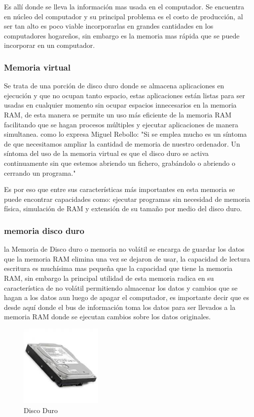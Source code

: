 \documentclass{article}
\begin{document}
        Es allí donde se lleva la información mas usada en el computador. Se encuentra en núcleo del computador y su principal problema es el costo de producción, al ser tan alto es poco viable incorporarlas en grandes cantidades en los computadores hogareños, sin embargo es la memoria mas rápida que se puede incorporar en un computador.   
        
        
        
        
        \subsubsection{Memoria virtual}
        Se trata de una porción de disco duro donde se almacena aplicaciones en ejecución y que no ocupan tanto espacio, estas aplicaciones están listas para ser usadas en cualquier momento sin ocupar espacios innecesarios en la memoria RAM, de esta manera se permite un uso más eficiente de la memoria RAM facilitando que se hagan procesos múltiples y ejecutar aplicaciones de manera simultanea. como lo expresa Miguel Rebollo: "Si se emplea mucho es un síntoma de que necesitamos ampliar la cantidad de memoria de nuestro ordenador. Un síntoma del uso de la memoria virtual es que el disco duro se activa continuamente sin que estemos abriendo un fichero, grabándolo o abriendo o cerrando un programa."\cite{rebollo} 
        
        Es por eso que entre sus características más importantes en esta memoria se puede encontrar capacidades como: ejecutar programas sin necesidad de memoria física, simulación de RAM y extensión de su tamaño por medio del disco duro.\cite{gestion}  
        
        \subsubsection{memoria disco duro}
        la Memoria de Disco duro o memoria no volátil se encarga de guardar los datos que la memoria RAM elimina una vez se dejaron de usar, la capacidad de lectura  escritura es muchísima mas pequeña que la capacidad que tiene la memoria RAM, sin embargo la principal utilidad de esta memoria radica en su característica de no volátil permitiendo almacenar los datos y cambios que se hagan a los datos aun luego de apagar el computador, es importante decir que es desde aquí donde el bus de información toma los datos para ser llevados a la memoria RAM donde se ejecutan cambios sobre los datos originales. 
        
        \begin{figure}[h]
        \includegraphics[width=4cm]{discoDuro.jpg}
        \centering
        \caption{Disco Duro}
        \label{fig:discoDuro}
        \end{figure}
        
\end{document}

